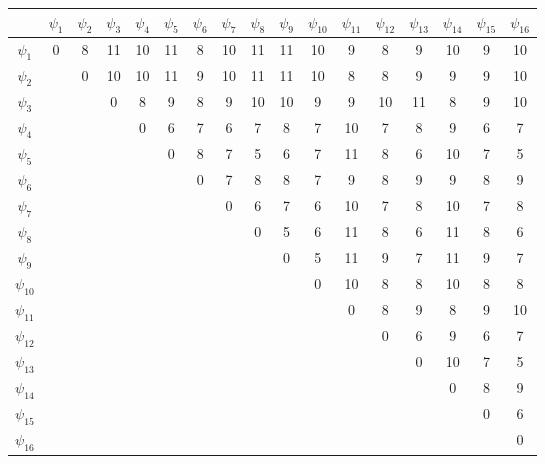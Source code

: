 \documentclass[12pt,a4paper]{report}
\begin{document}
\hfill\break
\pagebreak
\begin{tabular}{|c|c|c|c|c|c|c|c|c|c|c|c|c|c|c|c|c|}
    \hline
    & $\psi_{1}$ & $\psi_{2}$ & $\psi_{3}$ & $\psi_{4}$ & $\psi_{5}$ & $\psi_{6}$ & $\psi_{7}$ & $\psi_{8}$ & $\psi_{9}$ & $\psi_{10}$ & $\psi_{11}$ & $\psi_{12}$ & $\psi_{13}$ & $\psi_{14}$ & $\psi_{15}$ & $\psi_{16}$\\
    \hline
    $\psi_{1}$ & 0 & 8 & 11 & 10 & 11 & 8 & 10 & 11 & 11 & 10 & 9  & 8	 & 9  & 10 & 9 & 10 \\
    \hline
    $\psi_{2}$ &   & 0 & 10 & 10 & 11 & 9 & 10 & 11 & 11 & 10 & 8  & 8	 & 9  & 9  & 9 & 10 \\
    \hline
    $\psi_{3}$ &   &   & 0  & 8  & 9  & 8 & 9  & 10 & 10 & 9  & 9  & 10 & 11 & 8  & 9 & 10 \\
    \hline
    $\psi_{4}$ &   &   &    & 0  & 6  & 7 & 6  & 7  & 8  & 7  & 10 & 7  & 8  & 9  & 6 & 7  \\
    \hline
    $\psi_{5}$ &   &   &    &    & 0  & 8 & 7  & 5  & 6  & 7  & 11 & 8  & 6  & 10 & 7 & 5  \\
    \hline
    $\psi_{6}$ &   &   &    &    &    & 0 & 7  & 8  & 8  & 7  & 9  & 8  & 9  & 9  & 8 & 9  \\
    \hline
    $\psi_{7}$ &   &   &    &    &    &   & 0  & 6  & 7  & 6  & 10 & 7  & 8  & 10 & 7 & 8  \\
    \hline
    $\psi_{8}$ &   &   &    &    &    &   &    & 0  & 5  & 6  & 11 & 8  & 6  & 11 & 8 & 6  \\
    \hline
    $\psi_{9}$ &   &   &    &    &    &   &    &    & 0  & 5  & 11 & 9  & 7  & 11 & 9 & 7  \\
    \hline
    $\psi_{10}$ &   &   &    &    &    &   &    &    &    & 0  & 10 & 8  & 8  & 10 & 8 & 8  \\
    \hline
    $\psi_{11}$ &   &   &    &    &    &   &    &    &    &    & 0  & 8  & 9  & 8  & 9 & 10 \\
    \hline
    $\psi_{12}$ &   &   &    &    &    &   &    &    &    &    &    & 0  & 6  & 9  & 6 & 7  \\
    \hline
    $\psi_{13}$ &   &   &    &    &    &   &    &    &    &    &    &    & 0  & 10 & 7 & 5  \\
    \hline
    $\psi_{14}$ &   &   &    &    &    &   &    &    &    &    &    &    &    & 0  & 8 & 9  \\
    \hline
    $\psi_{15}$ &   &   &    &    &    &   &    &    &    &    &    &    &    &    & 0 & 6  \\
    \hline
    $\psi_{16}$ &   &   &    &    &    &   &    &    &    &    &    &    &    &    &   & 0  \\
    \hline
\end{tabular}
\end{document}
